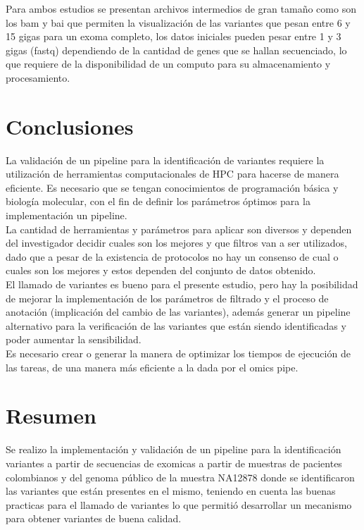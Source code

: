 Para ambos estudios se presentan archivos intermedios de gran tamaño como son los bam y bai que permiten la visualización de las variantes que pesan entre 6 y 15 gigas para un exoma completo, los datos iniciales pueden pesar entre 1 y 3 gigas (fastq) dependiendo de la cantidad de genes que se hallan secuenciado, lo que requiere de la disponibilidad de un computo para su almacenamiento y procesamiento. 

\section{Conclusiones}

La validación de un pipeline para la identificación de variantes requiere la utilización de herramientas computacionales de HPC para hacerse de manera eficiente. Es necesario que se tengan conocimientos de programación básica y biología molecular, con el fin de definir los parámetros óptimos para la implementación un pipeline.\\ 

La cantidad de herramientas y parámetros para aplicar son diversos y dependen del investigador decidir cuales son los mejores y que filtros van a ser utilizados, dado que a pesar de la existencia de protocolos no hay un consenso de cual o cuales son los mejores y estos dependen del conjunto de datos obtenido. \\ 

El llamado de variantes es bueno para el presente estudio, pero hay la posibilidad de mejorar la implementación de los parámetros de filtrado y el proceso de anotación (implicación del cambio de las variantes), además generar un pipeline alternativo para la verificación de las variantes que están siendo identificadas y poder aumentar la sensibilidad. \\

Es necesario crear o generar la manera de optimizar los tiempos de ejecución de las tareas, de una manera más eficiente a la dada por el omics pipe.

\section*{Resumen}

Se realizo la implementación y validación de un pipeline para la identificación variantes a partir de secuencias de exomicas a partir de muestras de pacientes colombianos y del genoma público de la muestra NA12878 donde se identificaron las variantes que están presentes en el mismo, teniendo en cuenta las buenas practicas para el llamado de variantes lo que permitió desarrollar un mecanismo para obtener variantes de buena calidad.